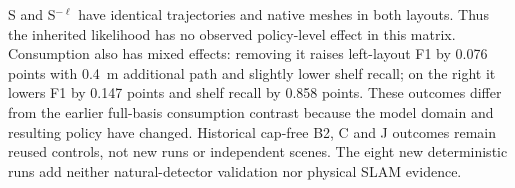 S and S$^{-\ell}$ have identical trajectories and native meshes in both layouts. Thus the inherited likelihood has no observed policy-level effect in this matrix. Consumption also has mixed effects: removing it raises left-layout F1 by 0.076 points with 0.4~m additional path and slightly lower shelf recall; on the right it lowers F1 by 0.147 points and shelf recall by 0.858 points. These outcomes differ from the earlier full-basis consumption contrast because the model domain and resulting policy have changed. Historical cap-free B2, C and J outcomes remain reused controls, not new runs or independent scenes. The eight new deterministic runs add neither natural-detector validation nor physical SLAM evidence.
